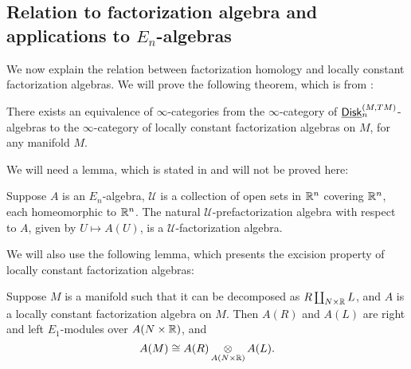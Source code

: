 \documentclass[twoside]{article}
\begin{document}
\subsection{Relation to factorization algebra and applications to
\texorpdfstring{$E_n$}{En}-algebras}

We now explain the relation between factorization homology and
locally constant factorization algebras. We will prove the following theorem,
which is from \cite{GTZ10}:

\begin{theorem}\label{f}
    There exists an equivalence of $\infty$-categories from the $\infty$-category of
    $\underline{\smash{\mathsf{Disk}}}_n^{(M,TM)}$-algebras to the $\infty$-category of locally constant
    factorization algebras on $M$, for any manifold $M$.
\end{theorem}

We will need a lemma, which is stated in \cite{Lur16} and will not be proved
here:

\begin{lemma}\label{newb}
    Suppose $A$ is an $E_n$-algebra, $\mathscr U$ is a collection
    of open sets in $\mathbb{R}^n$ covering $\mathbb{R}^n$, each homeomorphic to $\mathbb{R}^n$. The natural
    $\mathscr U$-prefactorization algebra with respect to $A$, given by
    $U\mapsto A(U)$, is a $\mathscr U$-factorization algebra.
\end{lemma}

We will also use the following lemma,
which presents the excision property of locally constant factorization algebras:

\begin{lemma}\label{newa}
    Suppose $M$ is a manifold such that it can be decomposed as 
    $R\coprod_{N\times\mathbb{R}}L$, and $A$ is a locally constant factorization algebra
    on $M$. Then $A(R)$ and $A(L)$ are right and left $E_1$-modules over $A(N\times\mathbb{R})$,
    and $$A(M)\cong A(R)\mathop{\operatorname{\otimes}}_{A(N\times\mathbb{R})}A(L).$$
\end{lemma}
\end{document}
